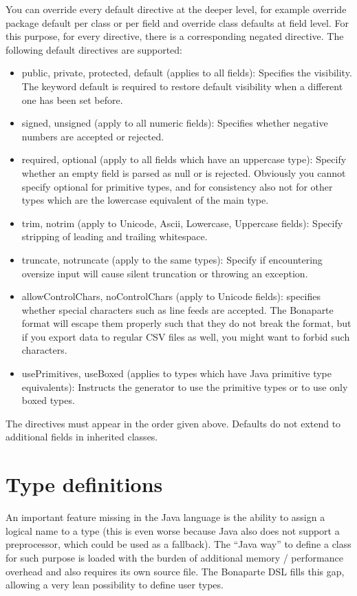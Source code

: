\documentclass[11pt,a4paper,oneside]{article}
\begin{document}
\noindent You can override every default directive at the deeper level, for example override package default per class or per field and override class defaults
at field level. For this purpose, for every directive, there is a corresponding negated directive.
The following default directives are supported:
\begin{itemize}
  \item {\ttfamily public}, {\ttfamily private}, {\ttfamily protected}, {\ttfamily default} (applies to all fields): Specifies the visibility. The keyword
   {\ttfamily default} is required to restore default visibility when a different one has been set before.
   \item {\ttfamily signed}, {\ttfamily unsigned} (apply to all numeric fields): Specifies whether negative numbers are accepted or rejected.
   \item {\ttfamily required}, {\ttfamily optional} (apply to all fields which have an uppercase type): Specify whether an empty field is parsed as
    {\ttfamily null} or is rejected. Obviously you cannot specify {\ttfamily optional} for primitive types, and for consistency also not for other types which
    are the lowercase equivalent of the main type. 
  \item {\ttfamily trim}, {\ttfamily notrim} (apply to {\ttfamily Unicode}, {\ttfamily Ascii}, {\ttfamily Lowercase}, {\ttfamily Uppercase} fields):
    Specify stripping of leading and trailing whitespace. 
  \item {\ttfamily truncate}, {\ttfamily notruncate} (apply to the same types): Specify if encountering oversize input will cause silent truncation or throwing an exception.
  \item {\ttfamily allowControlChars}, {\ttfamily noControlChars} (apply to {\ttfamily Unicode} fields): specifies whether special characters such as line feeds are accepted.
    The Bonaparte format will escape them properly such that they do not break the format, but if you export data to regular CSV files as well, you might want to
    forbid such characters.
  \item {\ttfamily usePrimitives}, {\ttfamily useBoxed} (applies to types which have Java primitive type equivalents): Instructs the generator to use the primitive types
    or to use only boxed types. 
\end{itemize}
The directives must appear in the order given above. Defaults do not extend to additional fields in inherited classes.

\section{Type definitions}
An important feature missing in the Java language is the ability to assign a logical name to a type (this is even worse because Java also does not support a preprocessor,
which could be used as a fallback). The ``Java way'' to define a class for such purpose is loaded with the burden of additional memory / performance overhead
and also requires its own source file. The Bonaparte DSL fills this gap, allowing a very lean possibility to define user types.
\end{document}
